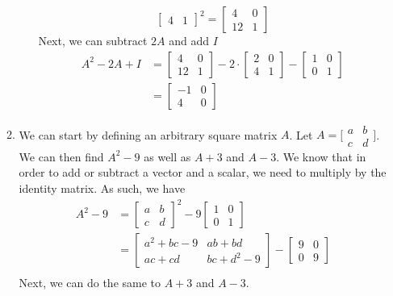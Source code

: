 \documentclass[11pt, letterpaper, twoside]{article}
\begin{document}
\begin{enumerate}
\begin{enumerate}[label=(\alph*)]
\begin{enumerate}[label=\roman*.]
$$\begin{bmatrix}
4 & 1
\end{bmatrix}^2=\begin{bmatrix}
4 & 0\\
12 & 1
\end{bmatrix}$$
Next, we can subtract $2A$ and add $I$
\begin{align*}
A^2-2A+I&=\begin{bmatrix}
4 & 0\\
12 & 1
\end{bmatrix}-2\cdot \begin{bmatrix}
2 & 0\\
4 & 1
\end{bmatrix}-\begin{bmatrix}
1 & 0\\
0 & 1
\end{bmatrix}\\
&=\begin{bmatrix}
-1 & 0\\
4 & 0
\end{bmatrix}
\end{align*}
\end{enumerate}
\item We can start by defining an arbitrary square matrix $A$. Let $A=\big[\begin{smallmatrix}
  a & b\\
  c & d
\end{smallmatrix}\big]$. We can then find $A^2-9$ as well as $A+3$ and $A-3$.%
We know that in order to add or subtract a vector and a scalar, we need to multiply by the identity matrix. As such, we have
\begin{align*}
A^2-9&=\begin{bmatrix}
a & b \\
c & d
\end{bmatrix}^2-9\begin{bmatrix}
1 & 0 \\
0 & 1
\end{bmatrix}\\
&=\begin{bmatrix}
a^2+bc-9&ab+bd\\
ac+cd&bc+d^2-9
\end{bmatrix}-\begin{bmatrix}
9 & 0 \\
0 & 9
\end{bmatrix}\\
\end{align*}
Next, we can do the same to $A+3$ and $A-3$.
\begin{align*}

\end{align*}
\end{enumerate}
\end{enumerate}
\end{document}
